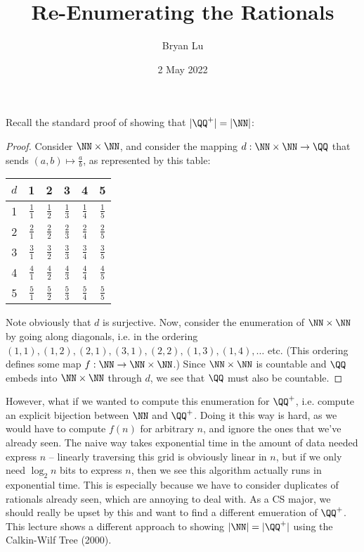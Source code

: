 \documentclass[12pt]{scrartcl}
\title{Re-Enumerating the Rationals}
\author{Bryan Lu}
\date{2 May 2022} %
\begin{document}
\maketitle

Recall the standard proof of showing that $|\QQ^+| = |\NN|$:

\begin{proof}
	Consider $\NN \times \NN$, and consider the mapping $d : \NN \times \NN \to \QQ$ that sends $(a,b) \mapsto \frac ab$, as represented by this table:
	\begin{center}
		\begin{tabular}{c|ccccc}
			$d$ & 1          & 2          & 3          & 4          & 5          \\ \hline
			1   & $\frac 11$ & $\frac 12$ & $\frac 13$ & $\frac 14$ & $\frac 15$ \\
			2   & $\frac 21$ & $\frac 22$ & $\frac 23$ & $\frac 24$ & $\frac 25$ \\
			3   & $\frac 31$ & $\frac 32$ & $\frac 33$ & $\frac 34$ & $\frac 35$ \\
			4   & $\frac 41$ & $\frac 42$ & $\frac 43$ & $\frac 44$ & $\frac 45$ \\
			5   & $\frac 51$ & $\frac 52$ & $\frac 53$ & $\frac 54$ & $\frac 55$ \\
		\end{tabular}
	\end{center}
	Note obviously that $d$ is surjective. Now, consider the enumeration of $\NN \times \NN$ by going along diagonals, i.e. in the ordering $(1,1), (1,2), (2,1),  (3,1), (2,2), (1,3), (1, 4), \dots$ etc. (This ordering defines some map $f : \NN \to \NN \times \NN$.) Since $\NN \times \NN$ is countable and $\QQ$ embeds into $\NN \times \NN$ through $d$, we see that $\QQ$ must also be countable.
\end{proof}

However, what if we wanted to compute this enumeration for $\QQ^+$, i.e. compute an explicit bijection between $\NN$ and $\QQ^+$. Doing it this way is hard, as we would have to compute $f(n)$ for arbitrary $n$, and ignore the ones that we've already seen. The naive way takes exponential time in the amount of data needed express $n$ -- linearly traversing this grid is obviously linear in $n$, but if we only need $\log_2 n$ bits to express $n$, then we see this algorithm actually runs in exponential time. This is especially because we have to consider duplicates of rationals already seen, which are annoying to deal with. As a CS major, we should really be upset by this and want to find a different emueration of $\QQ^+$. This lecture shows a different approach to showing $|\NN| = |\QQ^+|$ using the Calkin-Wilf Tree (2000).
\end{document}
